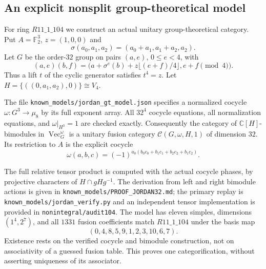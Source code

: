 \subsection{An explicit nonsplit group-theoretical model}
For ring $R11\_1\_104$ we construct an actual unitary group-theoretical
category.  Put $A=\mathbb F_2^3$, $z=(1,0,0)$ and
\[
 \sigma(a_0,a_1,a_2)=(a_0+a_1,a_1+a_2,a_2).
\]
Let $G$ be the order-$32$ group on pairs $(a,e)$, $0\leq e<4$, with
\[
 (a,e)(b,f)=\bigl(a+\sigma^e(b)+z\lfloor(e+f)/4\rfloor,
                         e+f\pmod4\bigr).
\]
Thus a lift $t$ of the cyclic generator satisfies $t^4=z$.  Let
$H=\{((0,a_1,a_2),0)\}\cong V_4$.

The file \texttt{known\_models/jordan\_gt\_model.json} specifies a
normalized cocycle $\omega:G^3\to\mu_8$ by its full exponent array.
All $32^4$ cocycle equations, all normalization equations, and
$\omega|_{H^3}=1$ are checked exactly.  Consequently the category of
$\mathbb C[H]$-bimodules in $\operatorname{Vec}_G^\omega$ is a unitary
fusion category $\mathcal C(G,\omega,H,1)$ of dimension $32$.
Its restriction to $A$ is the explicit cocycle
\[
 \omega(a,b,c)=(-1)^{a_0(b_0c_0+b_1c_1+b_2c_2+b_1c_2)}.
\]

The full relative tensor product is computed with the actual cocycle
phases, by projective characters of $H\cap gHg^{-1}$.  The derivation
from left and right bimodule actions is given in
\texttt{known\_models/PROOF\_JORDAN32.md}; the primary replay is
\texttt{known\_models/jordan\_verify.py} and an independent tensor
implementation is provided in \texttt{nonintegral/audit104}.
The model has eleven simples, dimensions $(1^4,2^7)$, and all
$1331$ fusion coefficients match $R11\_1\_104$ under the basis map
\[
 (0,4,8,5,9,1,2,3,10,6,7).
\]
Existence rests on the verified cocycle and bimodule construction,
not on associativity of a guessed fusion table.  This proves one
categorification, without asserting uniqueness of its associator.
